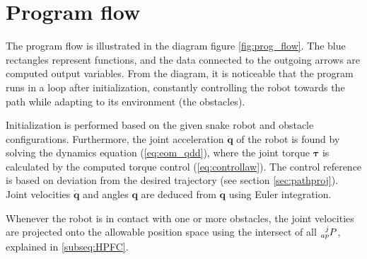 
\section{Program flow}

The program flow is illustrated in the diagram figure \ref{fig:prog_flow}. The blue rectangles represent functions, and the data connected to the outgoing arrows are computed output variables. From the diagram, it is noticeable that the program runs in a loop after initialization, constantly controlling the robot towards the path while adapting to its environment (the obstacles).

Initialization is performed based on the given snake robot and obstacle configurations. Furthermore, the joint acceleration $\mathbf{\ddot{q}}$ of the robot is found by solving the dynamics equation (\ref{eq:eom_qdd}), where the joint torque $\boldsymbol{\tau}$ is calculated by the computed torque control (\ref{eq:controllaw}). The control reference is based on deviation from the desired trajectory (see section \ref{sec:pathproj}). Joint velocities $\mathbf{\dot{q}}$ and angles $\mathbf{q}$ are deduced from $\mathbf{\ddot{q}}$ using Euler integration.

Whenever the robot is in contact with one or more obstacles, the joint velocities are projected onto the allowable position space using the intersect of all $\prescript{j}{ap}{P}$, explained in \ref{subseq:HPFC}.

